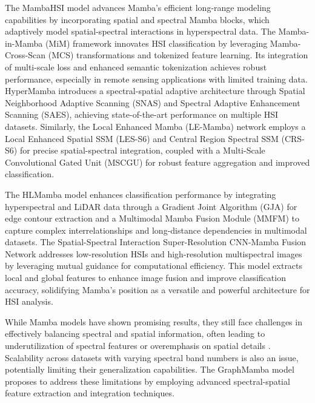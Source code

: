 \documentclass[journal]{IEEEtran}
\begin{document}
The MambaHSI model \cite{10604894} advances Mamba's efficient long-range modeling capabilities by incorporating spatial and spectral Mamba blocks, which adaptively model spatial-spectral interactions in hyperspectral data. The Mamba-in-Mamba (MiM) framework \cite{ZHOU2025128751} innovates HSI classification by leveraging Mamba-Cross-Scan (MCS) transformations and tokenized feature learning. Its integration of multi-scale loss and enhanced semantic tokenization achieves robust performance, especially in remote sensing applications with limited training data. HyperMamba \cite{10720896} introduces a spectral-spatial adaptive architecture through Spatial Neighborhood Adaptive Scanning (SNAS) and Spectral Adaptive Enhancement Scanning (SAES), achieving state-of-the-art performance on multiple HSI datasets. Similarly, the Local Enhanced Mamba (LE-Mamba) network \cite{WANG2024104092} employs a Local Enhanced Spatial SSM (LES-S6) and Central Region Spectral SSM (CRS-S6) for precise spatial-spectral integration, coupled with a Multi-Scale Convolutional Gated Unit (MSCGU) for robust feature aggregation and improved classification.

The HLMamba model \cite{10679212} enhances classification performance by integrating hyperspectral and LiDAR data through a Gradient Joint Algorithm (GJA) for edge contour extraction and a Multimodal Mamba Fusion Module (MMFM) to capture complex interrelationships and long-distance dependencies in multimodal datasets. The Spatial-Spectral Interaction Super-Resolution CNN-Mamba Fusion Network \cite{10695805} addresses low-resolution HSIs and high-resolution multispectral images by leveraging mutual guidance for computational efficiency. This model extracts local and global features to enhance image fusion and improve classification accuracy, solidifying Mamba's position as a versatile and powerful architecture for HSI analysis.

While Mamba models have shown promising results, they still face challenges in effectively balancing spectral and spatial information, often leading to underutilization of spectral features or overemphasis on spatial details \cite{sheng2024dualmamba}. Scalability across datasets with varying spectral band numbers is also an issue, potentially limiting their generalization capabilities. The GraphMamba model proposes to address these limitations by employing advanced spectral-spatial feature extraction and integration techniques.
\end{document}
